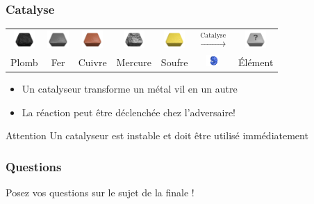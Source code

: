 \documentclass{beamer}
\begin{document}
\begin{frame}
    \frametitle{Catalyse}
    \vspace{1cm}
    \begin{tabular}{ccccccc}
        \includegraphics[width=0.8cm]{../img/material-lead} &
        \includegraphics[width=0.8cm]{../img/material-iron} &
        \includegraphics[width=0.8cm]{../img/material-copper} &
        \includegraphics[width=0.8cm]{../img/material-mercury} &
        \includegraphics[width=0.8cm]{../img/material-sulfur} &
        $\xrightarrow{\text{Catalyse}}$ &
        \includegraphics[width=0.8cm]{../img/material-other}\\
        Plomb & Fer & Cuivre & Mercure & Soufre &
        \includegraphics[width=0.5cm]{../img/material-catalyst} &
        Élément
    \end{tabular}

    \vspace{1cm}
    \begin{itemize}
        \item Un catalyseur transforme un métal vil en un autre
        \item La réaction peut être déclenchée chez l’adversaire!
    \end{itemize}
    \begin{alertblock}{Attention}
        Un catalyseur est instable et doit être utilisé immédiatement
    \end{alertblock}
\end{frame}

\begin{frame}
    \frametitle{Questions}
    Posez vos questions sur le sujet de la finale !
\end{frame}
\end{document}
